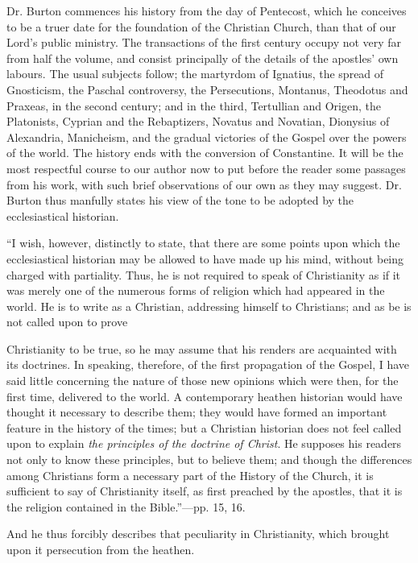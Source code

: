 Dr. Burton
commences his history from the day of Pentecost, which he conceives to
be a truer date for the foundation of the Christian Church, than that of
our Lord's public ministry. The transactions of the first century
occupy not very far from half the volume, and consist principally of the
details of the apostles' own labours. The usual subjects follow; the
martyrdom of Ignatius, the spread of Gnosticism, the Paschal
controversy, the Persecutions, Montanus, Theodotus and Praxeas, in the
second century; and in the third, Tertullian and Origen, the Platonists,
Cyprian and the Rebaptizers, Novatus and Novatian, Dionysius of
Alexandria, Manicheism, and the gradual victories of the Gospel over the
powers of the world. The history ends with the conversion of
Constantine. It will be the most respectful course to our author now to
put before the reader some passages from his work, with such brief
observations of our own as they may suggest. Dr. Burton thus manfully
states his view of the tone to be adopted by the ecclesiastical
historian.

``I wish,
however, distinctly to state, that there are some points upon which the
ecclesiastical historian may be allowed to have made up his mind,
without being charged with partiality. Thus, he is not required to speak
of Christianity as if it was merely one of the numerous forms of
religion which had appeared in the world. He is to write as a Christian,
addressing himself to Christians; and as be is not called upon to prove

Christianity to be true, so he may assume that his renders are
acquainted with its doctrines. In speaking, therefore, of the first
propagation of the Gospel, I have said little concerning the nature of
those new opinions which were then, for the first time, delivered to the
world. A contemporary heathen historian would have thought it necessary
to describe them; they would have formed an important feature in the
history of the times; but a Christian historian does not feel called
upon to explain \emph{the principles of the doctrine of Christ}. He
supposes his readers not only to know these principles, but to believe
them; and though the differences among Christians form a necessary part
of the History of the Church, it is sufficient to say of Christianity
itself, as first preached by the apostles, that it is the religion
contained in the Bible.''—pp. 15, 16.

And he thus
forcibly describes that peculiarity in Christianity, which brought upon
it persecution from the heathen.

